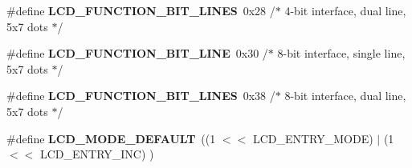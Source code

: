 \begin{DoxyCompactItemize}
\item 
\#define {\bfseries L\+C\+D\+\_\+\+F\+U\+N\+C\+T\+I\+O\+N\+\_\+B\+I\+T\+\_\+L\+I\+N\+ES}~0x28 /$\ast$ 4-\/bit interface, dual line,   5x7 dots $\ast$/\hypertarget{a00010_gab35032ab368a8bc90798e0c547fb24c2}{}\label{a00010_gab35032ab368a8bc90798e0c547fb24c2}

\item 
\#define {\bfseries L\+C\+D\+\_\+\+F\+U\+N\+C\+T\+I\+O\+N\+\_\+B\+I\+T\+\_\+L\+I\+NE}~0x30 /$\ast$ 8-\/bit interface, single line, 5x7 dots $\ast$/\hypertarget{a00010_gaa8aeee098cb4c84ec420e00d054abcce}{}\label{a00010_gaa8aeee098cb4c84ec420e00d054abcce}

\item 
\#define {\bfseries L\+C\+D\+\_\+\+F\+U\+N\+C\+T\+I\+O\+N\+\_\+B\+I\+T\+\_\+L\+I\+N\+ES}~0x38 /$\ast$ 8-\/bit interface, dual line,   5x7 dots $\ast$/\hypertarget{a00010_ga160a214f47869f8f98ad5add3a7568db}{}\label{a00010_ga160a214f47869f8f98ad5add3a7568db}

\item 
\#define {\bfseries L\+C\+D\+\_\+\+M\+O\+D\+E\+\_\+\+D\+E\+F\+A\+U\+LT}~((1 $<$$<$ L\+C\+D\+\_\+\+E\+N\+T\+R\+Y\+\_\+\+M\+O\+DE) $\vert$ (1 $<$$<$ L\+C\+D\+\_\+\+E\+N\+T\+R\+Y\+\_\+\+I\+NC) )\hypertarget{a00010_ga1849e2087d3034a3fffa67444beed109}{}\label{a00010_ga1849e2087d3034a3fffa67444beed109}

\end{DoxyCompactItemize}
